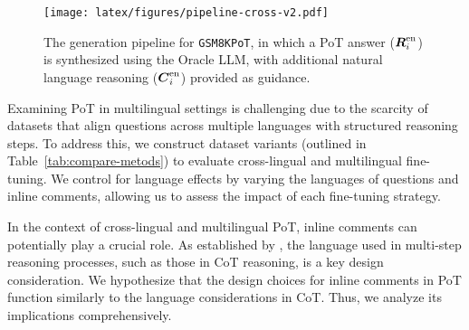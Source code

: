 \begin{figure}[!t]
    \texttt{[image: latex/figures/pipeline-cross-v2.pdf]}
    \caption{
    The generation pipeline for \texttt{GSM8KPoT}, in which a PoT answer ($\vb*{R}_i^\text{en}$) is synthesized using the Oracle LLM, with additional natural language reasoning ($\vb*{C}_i^\text{en}$) provided as guidance.
    }
    \label{fig:pipeline-cross}
\end{figure}








Examining PoT in multilingual settings is challenging due to the scarcity of datasets that align questions across multiple languages with structured reasoning steps.
%
To address this, we construct dataset variants (outlined in Table~\ref{tab:compare-metods}) to evaluate cross-lingual and multilingual fine-tuning.
%
We control for language effects by varying the languages of questions and inline comments, allowing us to assess the impact of each fine-tuning strategy.

In the context of cross-lingual and multilingual PoT, inline comments can potentially play a crucial role. As established by \citet{mgsm}, the language used in multi-step reasoning processes, such as those in CoT reasoning, is a key design consideration.
%
We hypothesize that the design choices for inline comments in PoT function similarly to the language considerations in CoT. 
Thus, we analyze its implications comprehensively.


%



